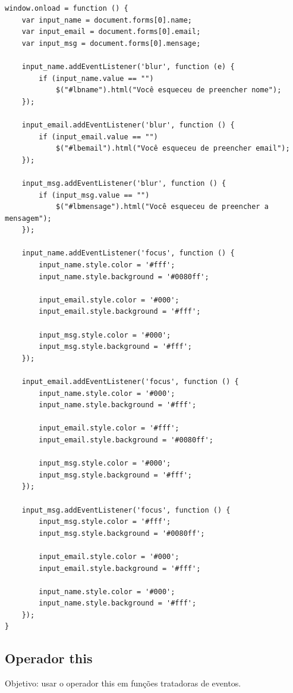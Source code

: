  \begin{lstlisting}
window.onload = function () {
    var input_name = document.forms[0].name;
    var input_email = document.forms[0].email;
    var input_msg = document.forms[0].mensage;

    input_name.addEventListener('blur', function (e) {
        if (input_name.value == "")
            $("#lbname").html("Você esqueceu de preencher nome");
    });

    input_email.addEventListener('blur', function () {
        if (input_email.value == "")
            $("#lbemail").html("Você esqueceu de preencher email");
    });

    input_msg.addEventListener('blur', function () {
        if (input_msg.value == "")
            $("#lbmensage").html("Você esqueceu de preencher a mensagem");
    });

    input_name.addEventListener('focus', function () {
        input_name.style.color = '#fff';
        input_name.style.background = '#0080ff';

        input_email.style.color = '#000';
        input_email.style.background = '#fff';

        input_msg.style.color = '#000';
        input_msg.style.background = '#fff';
    });

    input_email.addEventListener('focus', function () {
        input_name.style.color = '#000';
        input_name.style.background = '#fff';

        input_email.style.color = '#fff';
        input_email.style.background = '#0080ff';

        input_msg.style.color = '#000';
        input_msg.style.background = '#fff';
    });

    input_msg.addEventListener('focus', function () {
        input_msg.style.color = '#fff';
        input_msg.style.background = '#0080ff';

        input_email.style.color = '#000';
        input_email.style.background = '#fff';

        input_name.style.color = '#000';
        input_name.style.background = '#fff';
    });
}
 \end{lstlisting} 
 
 
\subsection{Operador this}
 Objetivo: usar o operador this em funções tratadoras de eventos.
 
